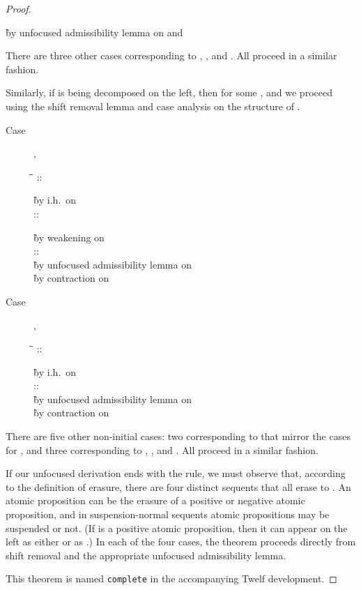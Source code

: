 \documentclass[acmtocl]{robtrans}\pdfoutput=1
\begin{document}
\begin{proof}
\begin{description}
\begin{tabbing}
  \` by unfocused admissibility lemma  
     on  and 
\end{tabbing}
\end{description}
There are three other cases
corresponding to , , and .
All proceed in a similar fashion. 

Similarly, if  is being decomposed
on the left, then  for some , and we proceed
using the shift removal lemma and case analysis on the structure
of .

\begin{description}
\item[Case] , \quad


\begin{tabbing}
\qquad \=  \= \kill
\>
 \> ::
 
  \` by i.h.~on \\
\>
 \> ::
 
  \` by weakening on \\
\>
 \> ::
 \\
  \` by unfocused admissibility lemma  on \\
\>
 \` by contraction on 
\end{tabbing}

\item[Case] , \quad


\begin{tabbing}
\qquad \=  \= \kill
\>
 \> ::
 
  \` by i.h.~on \\
\>  \> ::
\\
  \` by unfocused admissibility lemma  on  \\
\> 
  \` by contraction on 
\end{tabbing}

\end{description}
There are five other non-initial cases: two corresponding to
 that mirror the cases for , and three
corresponding to , ,
and . All proceed in a similar fashion. 

If our unfocused derivation ends with the  rule, we must
observe that, according to the definition of erasure, there are four
distinct sequents that all erase to .  An atomic
proposition can be the erasure of a positive or negative atomic
proposition, and in suspension-normal sequents atomic
propositions may be suspended or not.  (If  is a positive atomic
proposition, then it can appear on the left as either  or
as .)
In each of the four cases, the theorem proceeds directly from shift
removal and the appropriate unfocused admissibility lemma.

This
theorem is named {\tt complete} in the accompanying Twelf development.
\end{proof}
\end{document}
